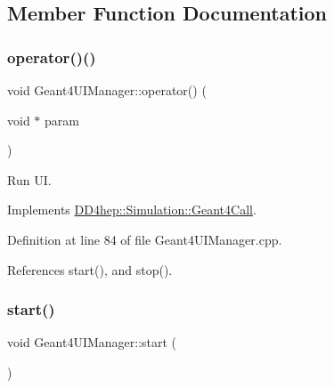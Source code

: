 \subsection{Member Function Documentation}
\hypertarget{class_d_d4hep_1_1_simulation_1_1_geant4_u_i_manager_a3b883391f9b66b1620c0ba44406b3247}{}\label{class_d_d4hep_1_1_simulation_1_1_geant4_u_i_manager_a3b883391f9b66b1620c0ba44406b3247} 
\subsubsection{\texorpdfstring{operator()()}{operator()()}}
{\footnotesize\ttfamily void Geant4\+U\+I\+Manager\+::operator() (\begin{DoxyParamCaption}\item[{void $\ast$}]{param }\end{DoxyParamCaption})\hspace{0.3cm}{\ttfamily [virtual]}}



Run UI. 



Implements \hyperlink{class_d_d4hep_1_1_simulation_1_1_geant4_call_ab55505a1c9fb5e928c995d1312d4158e}{D\+D4hep\+::\+Simulation\+::\+Geant4\+Call}.



Definition at line 84 of file Geant4\+U\+I\+Manager.\+cpp.



References start(), and stop().

\hypertarget{class_d_d4hep_1_1_simulation_1_1_geant4_u_i_manager_af092b336d49fbb7cf68f41b60b4dc88d}{}\label{class_d_d4hep_1_1_simulation_1_1_geant4_u_i_manager_af092b336d49fbb7cf68f41b60b4dc88d} 
\subsubsection{\texorpdfstring{start()}{start()}}
{\footnotesize\ttfamily void Geant4\+U\+I\+Manager\+::start (\begin{DoxyParamCaption}{ }\end{DoxyParamCaption})}



